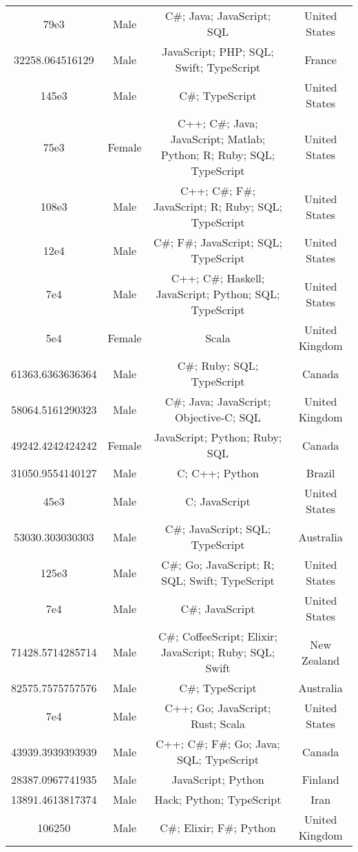 \begin{center}
\begin{tabular}{ |c|c|c|c| }
79e3  &  Male  &  C\#; Java; JavaScript; SQL  &  United States  \\ 
32258.064516129  &  Male  &  JavaScript; PHP; SQL; Swift; TypeScript  &  France  \\ 
145e3  &  Male  &  C\#; TypeScript  &  United States  \\ 
75e3  &  Female  &  C++; C\#; Java; JavaScript; Matlab; Python; R; Ruby; SQL; TypeScript  &  United States  \\ 
108e3  &  Male  &  C++; C\#; F\#; JavaScript; R; Ruby; SQL; TypeScript  &  United States  \\ 
12e4  &  Male  &  C\#; F\#; JavaScript; SQL; TypeScript  &  United States  \\ 
7e4  &  Male  &  C++; C\#; Haskell; JavaScript; Python; SQL; TypeScript  &  United States  \\ 
5e4  &  Female  &  Scala  &  United Kingdom  \\ 
61363.6363636364  &  Male  &  C\#; Ruby; SQL; TypeScript  &  Canada  \\ 
58064.5161290323  &  Male  &  C\#; Java; JavaScript; Objective-C; SQL  &  United Kingdom  \\ 
49242.4242424242  &  Female  &  JavaScript; Python; Ruby; SQL  &  Canada  \\ 
31050.9554140127  &  Male  &  C; C++; Python  &  Brazil  \\ 
45e3  &  Male  &  C; JavaScript  &  United States  \\ 
53030.303030303  &  Male  &  C\#; JavaScript; SQL; TypeScript  &  Australia  \\ 
125e3  &  Male  &  C\#; Go; JavaScript; R; SQL; Swift; TypeScript  &  United States  \\ 
7e4  &  Male  &  C\#; JavaScript  &  United States  \\ 
71428.5714285714  &  Male  &  C\#; CoffeeScript; Elixir; JavaScript; Ruby; SQL; Swift  &  New Zealand  \\ 
82575.7575757576  &  Male  &  C\#; TypeScript  &  Australia  \\ 
7e4  &  Male  &  C++; Go; JavaScript; Rust; Scala  &  United States  \\ 
43939.3939393939  &  Male  &  C++; C\#; F\#; Go; Java; SQL; TypeScript  &  Canada  \\ 
28387.0967741935  &  Male  &  JavaScript; Python  &  Finland  \\ 
13891.4613817374  &  Male  &  Hack; Python; TypeScript  &  Iran  \\ 
106250  &  Male  &  C\#; Elixir; F\#; Python  &  United Kingdom  \\ 

\end{tabular}
\end{center}
